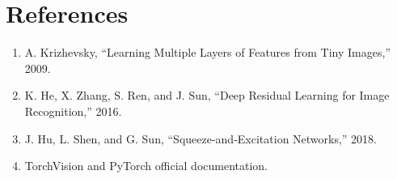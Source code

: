 \documentclass[11pt,a4paper]{article}
\begin{document}
\section*{References}
\begin{enumerate}[leftmargin=1.5em]
    \item A. Krizhevsky, ``Learning Multiple Layers of Features from Tiny Images,'' 2009.
    \item K. He, X. Zhang, S. Ren, and J. Sun, ``Deep Residual Learning for Image Recognition,'' 2016.
    \item J. Hu, L. Shen, and G. Sun, ``Squeeze-and-Excitation Networks,'' 2018.
    \item TorchVision and PyTorch official documentation.
\end{enumerate}
\end{document}
